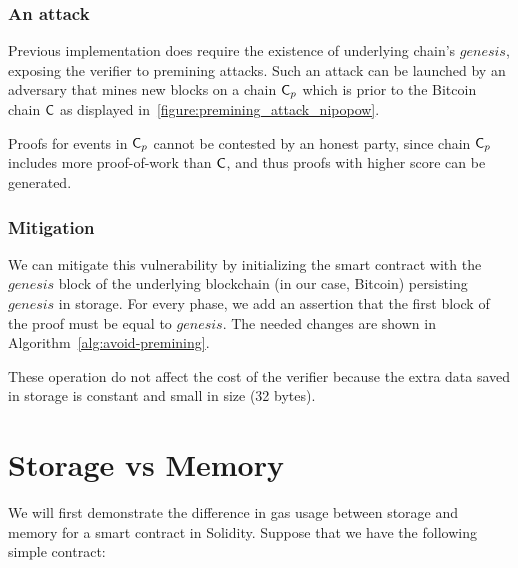 \subsubsection{An attack} Previous implementation does require the existence of
underlying chain's $genesis$, exposing the verifier to premining attacks. Such
an attack can be launched by an adversary that mines new blocks on a chain
$\mathsf{C}_p$ which is prior to the Bitcoin chain $\mathsf{C}$ as displayed
in~\ref{figure:premining_attack_nipopow}.


Proofs for events in $\mathsf{C}_p$ cannot be contested by an honest party, since
chain $\mathsf{C}_p$ includes more proof-of-work than $\mathsf{C}$, and thus proofs
with higher score can be generated.

\subsubsection{Mitigation}

We can mitigate this vulnerability by initializing the smart contract with the
$genesis$ block of the underlying blockchain (in our case, Bitcoin) persisting
$genesis$ in storage. For every phase, we add an assertion that the first block
of the proof must be equal to $genesis$. The needed changes are shown in
Algorithm~\ref{alg:avoid-premining}.

These operation do not affect the cost of the verifier because the extra data
saved in storage is constant and small in size (32 bytes).



\section{Storage vs Memory}

We will first demonstrate the difference in gas usage between storage and
memory for a smart contract in Solidity. Suppose that we have the following
simple contract:



